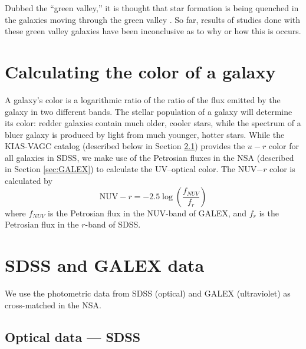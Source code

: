 Dubbed the ``green valley,'' it is thought that star formation 
is being quenched in the galaxies moving through the green valley 
\citep{Martin07}.  So far, results of studies done with these green valley 
galaxies have been inconclusive as to why or how this is occurs.




\section[Color Calculations]{Calculating the color of a galaxy}

A galaxy's color is a logarithmic ratio of the ratio of the flux emitted by the 
galaxy in two different bands.  The stellar population of a galaxy will 
determine its color: redder galaxies contain much older, cooler stars, while the 
spectrum of a bluer galaxy is produced by light from much younger, hotter stars.  
While the KIAS-VAGC catalog (described below in Section \ref{sec:SDSS}) provides 
the $u-r$ color for all galaxies in SDSS, we make use of the Petrosian fluxes in 
the NSA (described in Section \ref{sec:GALEX}) to calculate the UV--optical 
color.  The NUV$-r$ color is calculated by
\begin{equation}
    \text{NUV}-r = -2.5\log \left( \frac{f_{NUV}}{f_r} \right)
\end{equation}
where $f_{NUV}$ is the Petrosian flux in the NUV-band of GALEX, and $f_r$ is the 
Petrosian flux in the $r$-band of SDSS.



\section[SDSS Data]{SDSS and GALEX data}

We use the photometric data from SDSS (optical) and GALEX (ultraviolet) as 
cross-matched in the NSA.

\subsection{Optical data --- SDSS}\label{sec:SDSS}

